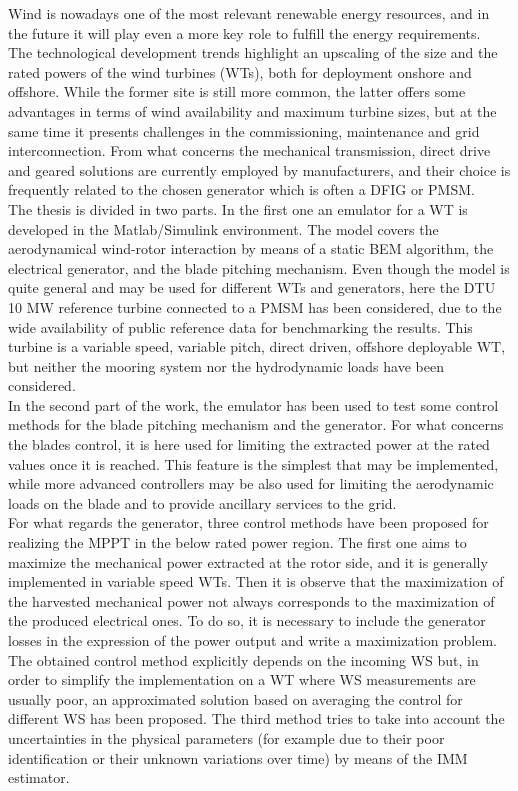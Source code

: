 Wind is nowadays one of the most relevant renewable energy resources, and in the future it will play even a more key role to fulfill the energy requirements.\\
The technological development trends highlight an upscaling of the size and the rated powers of the wind turbines (WTs), both for deployment onshore and offshore. While the former site is still more common, the latter offers some advantages in terms of wind availability and maximum turbine sizes, but at the same time it presents challenges in the commissioning, maintenance and grid interconnection. From what concerns the mechanical transmission, direct drive and geared solutions are currently employed by manufacturers, and their choice is frequently related to the chosen generator which is often a \acrfull{DFIG} or \acrfull{PMSM}.\\
The thesis is divided in two parts. In the first one an emulator for a WT is developed in the Matlab/Simulink environment. The model covers the aerodynamical wind-rotor interaction by means of a static BEM algorithm, the electrical generator, and the blade pitching mechanism. Even though the model is quite general and may be used for different WTs and generators, here the DTU 10 MW reference turbine connected to a PMSM has been considered, due to the wide availability of public reference data for benchmarking the results. This turbine is a variable speed, variable pitch, direct driven, offshore deployable WT, but neither the mooring system nor the hydrodynamic loads have been considered.\\
In the second part of the work, the emulator has been used to test some control methods for the blade pitching mechanism and the generator. For what concerns the blades control, it is here used for limiting the extracted power at the rated values once it is reached. This feature is the simplest that may be implemented, while more advanced controllers may be also used for limiting the aerodynamic loads on the blade and to provide ancillary services to the grid. \\
For what regards the generator, three control methods have been proposed for realizing the \acrfull{MPPT} in the below rated power region. The first one aims to maximize the mechanical power extracted at the rotor side, and it is generally implemented in variable speed WTs. Then it is observe that the maximization of the harvested mechanical power not always corresponds to the maximization of the produced electrical ones. To do so, it is necessary to include the generator losses in the expression of the power output and write a maximization problem. The obtained control method explicitly depends on the incoming WS but, in order to simplify the implementation on a WT where WS measurements are usually poor, an approximated solution based on averaging the control for different WS has been proposed. The third method tries to take into account the uncertainties in the physical parameters (for example due to their poor identification or their unknown variations over time) by means of the \acrfull{IMM} estimator. \\
